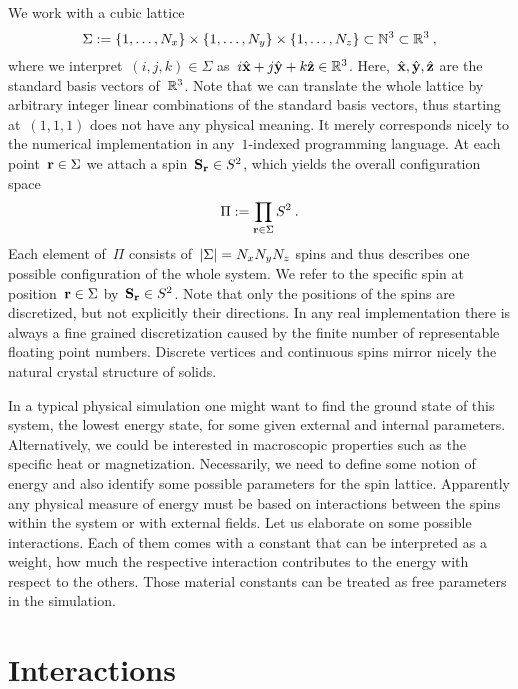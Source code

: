 We work with a cubic lattice
%
\begin{equation}
  \Sigma := \{1,\dots,N_x\} \times \{1,\dots,N_y\} \times
  \{1,\dots,N_z\} \subset \mathbb{N}^3 \subset \mathbb{R}^3\:,
\end{equation}
%
where we interpret~$(i,j,k) \in \Sigma$ as~$i \hat{\mathbf{x}} + j \hat{\mathbf{y}} + k \hat{\mathbf{z}}
\in \mathbb{R}^3$. Here,~$\hat{\mathbf{x}}, \hat{\mathbf{y}}, \hat{\mathbf{z}}$ are the standard basis vectors of~$\mathbb{R}^3$.
Note that we can translate the whole lattice by arbitrary integer linear
combinations of the standard basis vectors, thus starting at~$(1,1,1)$ does not
have any physical meaning. It merely corresponds nicely to the numerical
implementation in any~$1$-indexed programming language. At each point~$\mathbf{r} \in
\Sigma$ we attach a spin~$\mathbf{S}_{\mathbf{r}} \in S^2$, which yields the overall
configuration space
%
\begin{equation}
  \Pi := \prod_{\mathbf{r} \in \Sigma} S^2\:.
\end{equation}
%
Each element of~$\Pi$ consists of~$\abs{\Sigma}=N_x N_y N_z$ spins and thus
describes one possible configuration of the whole system. We refer to the
specific spin at position~$\mathbf{r} \in \Sigma$ by~$\mathbf{S}_{\mathbf{r}} \in S^2$. Note that only
the positions of the spins are discretized, but not explicitly their directions.
In any real implementation there is always a fine grained discretization caused
by the finite number of representable floating point numbers. Discrete vertices
and continuous spins mirror nicely the natural crystal structure of solids.

In a typical physical simulation one might want to find the ground state of this
system, \ie{} the lowest energy state, for some given external and internal
parameters. Alternatively, we could be interested in macroscopic properties such
as the specific heat or magnetization. Necessarily, we need to define some
notion of energy and also identify some possible parameters for the spin
lattice. Apparently any physical measure of energy must be based on interactions
between the spins within the system or with external fields. Let us elaborate on
some possible interactions. Each of them comes with a constant that can be
interpreted as a weight, \ie{} how much the respective interaction contributes
to the energy with respect to the others. Those material constants can be
treated as free parameters in the simulation.
%
\section{Interactions}\label{sec:interactions}
%
